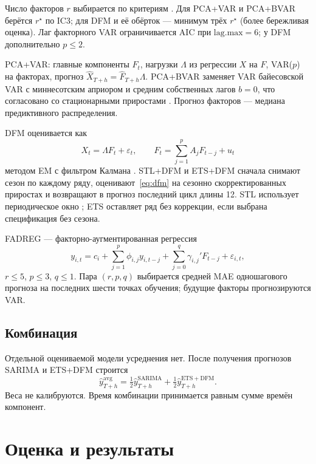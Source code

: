 \documentclass[12pt]{article}
\begin{document}
Число факторов $r$ выбирается по критериям \citet{baing2002}. Для PCA+VAR и PCA+BVAR берётся $r^\star$ по IC3; для DFM и её обёрток --- минимум трёх $r^\star$ (более бережливая оценка). Лаг факторного VAR ограничивается AIC при $\mathrm{lag.max}=6$; у DFM дополнительно $p\le 2$.

PCA+VAR: главные компоненты $F_t$, нагрузки $\Lambda$ из регрессии $X$ на $F$, VAR($p$) на факторах, прогноз $\hat X_{T+h}=\hat F_{T+h}\Lambda$. PCA+BVAR заменяет VAR байесовской VAR с миннесотским априором и средним собственных лагов $b=0$, что согласовано со стационарными приростами \citep{doan1984,litterman1986}. Прогноз факторов --- медиана предиктивного распределения.

DFM оценивается как
\begin{equation}
\label{eq:dfm}
X_t = \Lambda F_t + \varepsilon_t,\qquad
F_t = \sum_{j=1}^{p} A_j F_{t-j} + u_t
\end{equation}
методом EM с фильтром Калмана \citep{doz2012}. STL+DFM и ETS+DFM сначала снимают сезон по каждому ряду, оценивают~\eqref{eq:dfm} на сезонно скорректированных приростах и возвращают в прогноз последний цикл длины 12. STL использует периодическое окно \citep{cleveland1990}; ETS оставляет ряд без коррекции, если выбрана спецификация без сезона.

FADREG --- факторно-аугментированная регрессия
\begin{equation}
y_{i,t} = c_i + \sum_{j=1}^{p}\phi_{i,j} y_{i,t-j} + \sum_{j=0}^{q} \gamma_{i,j}' F_{t-j} + \varepsilon_{i,t},
\end{equation}
$r\le 5$, $p\le 3$, $q\le 1$. Пара $(r,p,q)$ выбирается средней MAE одношагового прогноза на последних шести точках обучения; будущие факторы прогнозируются VAR.

\subsection{Комбинация}

Отдельной оцениваемой модели усреднения нет. После получения прогнозов SARIMA и ETS+DFM строится
\begin{equation}
\label{eq:avg}
\hat y_{T+h}^{\mathrm{avg}} = \tfrac12 \hat y_{T+h}^{\mathrm{SARIMA}} + \tfrac12 \hat y_{T+h}^{\mathrm{ETS+DFM}}.
\end{equation}
Веса не калибруются. Время комбинации принимается равным сумме времён компонент.

\section{Оценка и результаты}
\end{document}
